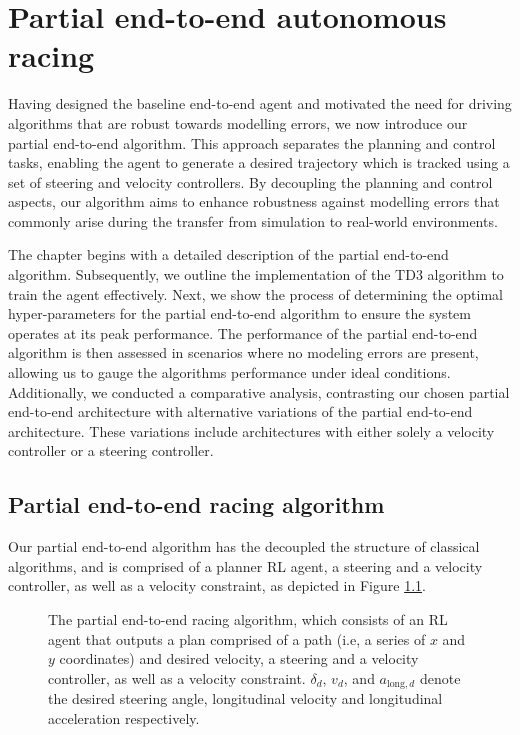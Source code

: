\chapter{Partial end-to-end autonomous racing}
\label{chp:partial_end_to_end_autonomous_racing}

Having designed the baseline end-to-end agent and motivated the need for driving algorithms that are robust towards modelling errors, we now introduce our partial end-to-end algorithm.
This approach separates the planning and control tasks, enabling the agent to generate a desired trajectory which is tracked using a set of steering and velocity controllers.
By decoupling the planning and control aspects, our algorithm aims to enhance robustness against modelling errors that commonly arise during the transfer from simulation to real-world environments.

The chapter begins with a detailed description of the partial end-to-end algorithm.
Subsequently, we outline the implementation of the TD3 algorithm to train the agent effectively.
Next, we show the process of determining the optimal hyper-parameters for the partial end-to-end algorithm to ensure the system operates at its peak performance. 
The performance of the partial end-to-end algorithm is then assessed in scenarios where no modeling errors are present, allowing us to gauge the algorithms performance under ideal conditions. 
Additionally, we conducted a comparative analysis, contrasting our chosen partial end-to-end architecture with alternative variations of the partial end-to-end architecture. 
These variations include architectures with either solely a velocity controller or a steering controller. 



\section{Partial end-to-end racing algorithm}

Our partial end-to-end algorithm has the decoupled the structure of classical algorithms, and is comprised of a planner RL agent, 
a steering and a velocity controller, as well as a velocity constraint, as depicted in Figure \ref{fig:steer_vel_architecture}.

\begin{figure}[htb!]
    \centering
    
    \caption[The partial end-to-end racing algorithm]{The partial end-to-end racing algorithm, which consists of an RL agent that outputs a plan comprised of a path (i.e, a series of $x$ and $y$ coordinates) and desired velocity, a steering and a velocity controller, as well as a velocity constraint. $\delta_{d}$, $v_{d}$, and $a_{\text{long},d}$ denote the desired steering angle, longitudinal velocity and longitudinal acceleration respectively.}
    \label{fig:steer_vel_architecture}
\end{figure}


